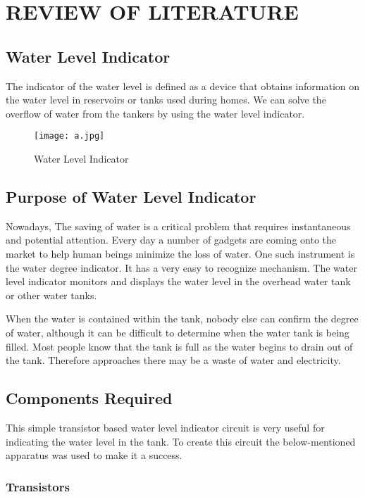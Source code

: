\documentclass[12pt,a4paper,oneside]{book}
\theoremstyle{plain}
\numberwithin{equation}{chapter} \DeclareMathOperator{\Var}{Var}
\begin{document}
\chapter{REVIEW OF LITERATURE}

\section{Water Level Indicator}\label{Sec2.1}

The indicator of the water level is defined as a device that obtains information on the water level in reservoirs or tanks used during homes. We can solve the overflow of water from the tankers by using the water level indicator.

\begin{figure}[hbt!]
    \centering
    \texttt{[image: a.jpg]}
    \caption{Water Level Indicator}
    \label{fig:a}
\end{figure}

\section{Purpose of Water Level Indicator}

Nowadays, The saving of water is a critical problem that requires instantaneous and potential attention. Every day a number of gadgets are coming onto the market to help human beings minimize the loss of water. One such instrument is the water degree indicator. It has a very easy to recognize mechanism. The water level indicator monitors and displays the water level in the overhead water tank or other water tanks. 

When the water is contained within the tank, nobody else can confirm the degree of water, although it can be difficult to determine when the water tank is being filled. Most people know that the tank is full as the water begins to drain out of the tank.
Therefore approaches there may be a waste of water and electricity.

\section{Components Required}
This simple transistor based water level indicator circuit is very useful for indicating the water level in the tank. To create this circuit the below-mentioned apparatus was used to make it a success. 

\subsection{Transistors}
\end{document}
